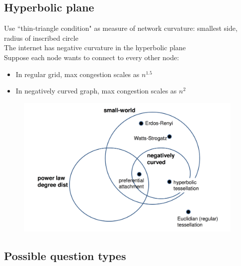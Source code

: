 \documentclass{article}
\begin{document}
\subsection{Hyperbolic plane}

Use ``thin-triangle condition" as measure of network curvature: smallest side, radius of inscribed circle \\
The internet has negative curvature in the hyperbolic plane \\
Suppose each node wants to connect to every other node:
\begin{itemize}
\item In regular grid, max congestion scales as $n^{1.5}$
\item In negatively curved graph, max congestion scales as $n^2$
\end{itemize}

\begin{figure}
\centering
\includegraphics[width=0.98\textwidth]{graph_classification.png}
\end{figure}

\subsection{Possible question types}
\end{document}
